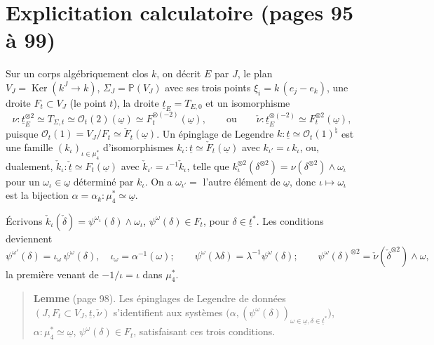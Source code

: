 \documentclass[11pt,a4paper]{article}
\begin{document}
\section*{Explicitation calculatoire (pages 95 à 99)}

Sur un corps algébriquement clos $k$, on décrit $E$ par $J$, le plan $V_J =
\operatorname{Ker}(k^J \to k)$, $\Sigma_J = \mathbb{P}(V_J)$ avec ses trois
points $\xi_i = k\,(e_j - e_k)$, une droite $F_t \subset V_J$ (le point $t$), la
droite $\underline{t}_E = T_{E,0}$ et un isomorphisme
\[
\nu : \underline{t}_E^{\otimes 2} \simeq T_{\Sigma,t} \simeq
\mathcal{O}_t(2)(\underline{\omega}) \simeq F_t^{\otimes(-2)}(\underline{\omega}),
\qquad \text{ou} \qquad \check\nu : \underline{t}_E^{\otimes(-2)} \simeq
F_t^{\otimes 2}(\underline{\omega}),
\]
puisque $\mathcal{O}_t(1) = V_J / F_t \simeq \check F_t(\underline{\omega})$.
Un épinglage de Legendre $k : \underline{t} \simeq \mathcal{O}_t(1)^{\natural}$
est une famille $(k_\iota)_{\iota \in \mu_4^{*}}$ d'isomorphismes $k_\iota :
\underline{t} \simeq \check F_t(\underline{\omega})$ avec $k_{\iota'} = \iota\,
k_\iota$, ou, dualement, $\check k_\iota : \check{\underline{t}} \simeq
F_t(\underline{\omega})$ avec $\check k_{\iota'} = \iota^{-1} \check k_\iota$,
telle que $k_\iota^{\otimes 2}(\delta^{\otimes 2}) = \nu(\delta^{\otimes 2})
\wedge \omega_\iota$ pour un $\omega_\iota \in \underline{\omega}$ déterminé par
$k_\iota$. On a $\omega_{\iota'} = $ l'autre élément de $\underline{\omega}$,
donc $\iota \mapsto \omega_\iota$ est la bijection $\alpha = \alpha_k : \mu_4^{*}
\simeq \underline{\omega}$.

Écrivons $\check k_\iota(\check\delta) = \psi^{\omega_\iota}(\delta) \wedge
\omega_\iota$, $\psi^{\omega}(\delta) \in F_t$, pour $\delta \in
\underline{t}^{*}$. Les conditions deviennent
\[
\psi^{\omega'}(\delta) = \iota_\omega\, \psi^{\omega}(\delta), \quad \iota_\omega
= \alpha^{-1}(\omega) ; \qquad \psi^{\omega}(\lambda\delta) = \lambda^{-1}
\psi^{\omega}(\delta) ; \qquad \psi^{\omega}(\delta)^{\otimes 2} =
\check\nu(\check\delta^{\otimes 2}) \wedge \omega,
\]
la première venant de $-1/\iota = \iota$ dans $\mu_4^{*}$.

\begin{quote}
\textbf{Lemme} (page 98). Les épinglages de Legendre de données
$(J, F_t \subset V_J, \underline{t}, \check\nu)$ s'identifient aux systèmes
$\bigl(\alpha, (\psi^{\omega}(\delta))_{\omega \in \underline{\omega}, \delta
\in \underline{t}^{*}}\bigr)$, $\alpha : \mu_4^{*} \simeq \underline{\omega}$,
$\psi^{\omega}(\delta) \in F_t$, satisfaisant ces trois conditions.
\end{quote}
\end{document}
